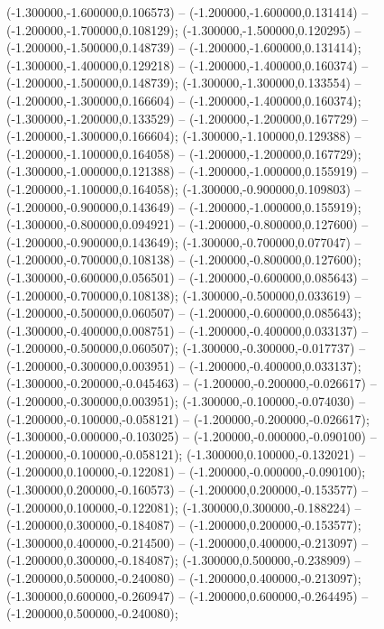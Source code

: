  (-1.300000,-1.600000,0.106573) -- (-1.200000,-1.600000,0.131414) -- (-1.200000,-1.700000,0.108129);
 (-1.300000,-1.500000,0.120295) -- (-1.200000,-1.500000,0.148739) -- (-1.200000,-1.600000,0.131414);
 (-1.300000,-1.400000,0.129218) -- (-1.200000,-1.400000,0.160374) -- (-1.200000,-1.500000,0.148739);
 (-1.300000,-1.300000,0.133554) -- (-1.200000,-1.300000,0.166604) -- (-1.200000,-1.400000,0.160374);
 (-1.300000,-1.200000,0.133529) -- (-1.200000,-1.200000,0.167729) -- (-1.200000,-1.300000,0.166604);
 (-1.300000,-1.100000,0.129388) -- (-1.200000,-1.100000,0.164058) -- (-1.200000,-1.200000,0.167729);
 (-1.300000,-1.000000,0.121388) -- (-1.200000,-1.000000,0.155919) -- (-1.200000,-1.100000,0.164058);
 (-1.300000,-0.900000,0.109803) -- (-1.200000,-0.900000,0.143649) -- (-1.200000,-1.000000,0.155919);
 (-1.300000,-0.800000,0.094921) -- (-1.200000,-0.800000,0.127600) -- (-1.200000,-0.900000,0.143649);
 (-1.300000,-0.700000,0.077047) -- (-1.200000,-0.700000,0.108138) -- (-1.200000,-0.800000,0.127600);
 (-1.300000,-0.600000,0.056501) -- (-1.200000,-0.600000,0.085643) -- (-1.200000,-0.700000,0.108138);
 (-1.300000,-0.500000,0.033619) -- (-1.200000,-0.500000,0.060507) -- (-1.200000,-0.600000,0.085643);
 (-1.300000,-0.400000,0.008751) -- (-1.200000,-0.400000,0.033137) -- (-1.200000,-0.500000,0.060507);
 (-1.300000,-0.300000,-0.017737) -- (-1.200000,-0.300000,0.003951) -- (-1.200000,-0.400000,0.033137);
 (-1.300000,-0.200000,-0.045463) -- (-1.200000,-0.200000,-0.026617) -- (-1.200000,-0.300000,0.003951);
 (-1.300000,-0.100000,-0.074030) -- (-1.200000,-0.100000,-0.058121) -- (-1.200000,-0.200000,-0.026617);
 (-1.300000,-0.000000,-0.103025) -- (-1.200000,-0.000000,-0.090100) -- (-1.200000,-0.100000,-0.058121);
 (-1.300000,0.100000,-0.132021) -- (-1.200000,0.100000,-0.122081) -- (-1.200000,-0.000000,-0.090100);
 (-1.300000,0.200000,-0.160573) -- (-1.200000,0.200000,-0.153577) -- (-1.200000,0.100000,-0.122081);
 (-1.300000,0.300000,-0.188224) -- (-1.200000,0.300000,-0.184087) -- (-1.200000,0.200000,-0.153577);
 (-1.300000,0.400000,-0.214500) -- (-1.200000,0.400000,-0.213097) -- (-1.200000,0.300000,-0.184087);
 (-1.300000,0.500000,-0.238909) -- (-1.200000,0.500000,-0.240080) -- (-1.200000,0.400000,-0.213097);
 (-1.300000,0.600000,-0.260947) -- (-1.200000,0.600000,-0.264495) -- (-1.200000,0.500000,-0.240080);
